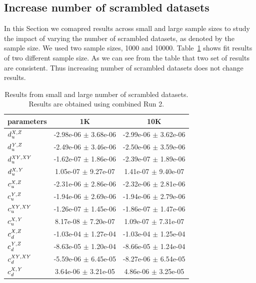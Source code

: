 \subsection{Increase number of scrambled datasets}
\label{lab:10K_scrambleddatasets}


In this Section we comapred results across small and large sample sizes to study the  
impact of varying the number of scrambled datasets, 
as denoted by the sample size. We used two sample sizes, 1000 and 10000.
Table~\ref{table:scrambel_results_10K} shows fit results of two different sample size.
As we can see from the table that two set of results are consistent. Thus increasing number 
of scrambled datasets does not change results.

\begin{table}[hp]
    \begin{center}
    \begin{tabular}{|l|c|c|}
    \hline
    
    parameters & 1K & 10K \\ 
    \hline
    $d_{\it u}^{\it X,Z}$ & -2.98e-06 $\pm$ 3.68e-06& -2.99e-06 $\pm$ 3.62e-06\\
    \hline
    $d_{\it u}^{\it Y,Z}$ & -2.49e-06 $\pm$ 3.46e-06& -2.50e-06 $\pm$ 3.59e-06\\
    \hline
    $d_{\it u}^{\it XY,XY}$ & -1.62e-07 $\pm$ 1.86e-06& -2.39e-07 $\pm$ 1.89e-06\\
    \hline
    $d_{\it u}^{\it X,Y}$ & 1.05e-07 $\pm$ 9.27e-07& 1.41e-07 $\pm$ 9.40e-07\\
    \hline
    $c_{\it u}^{\it X,Z}$ & -2.31e-06 $\pm$ 2.86e-06& -2.32e-06 $\pm$ 2.81e-06\\
    \hline
    $c_{\it u}^{\it Y,Z}$ & -1.94e-06 $\pm$ 2.69e-06& -1.94e-06 $\pm$ 2.79e-06\\
    \hline
    $c_{\it u}^{\it XY,XY}$ & -1.26e-07 $\pm$ 1.45e-06& -1.86e-07 $\pm$ 1.47e-06\\
    \hline
    $c_{\it u}^{\it X,Y}$ & 8.17e-08 $\pm$ 7.20e-07& 1.09e-07 $\pm$ 7.31e-07\\
    \hline
    $c_{\it d}^{\it X,Z}$ & -1.03e-04 $\pm$ 1.27e-04& -1.03e-04 $\pm$ 1.25e-04\\
    \hline
    $c_{\it d}^{\it Y,Z}$ & -8.63e-05 $\pm$ 1.20e-04& -8.66e-05 $\pm$ 1.24e-04\\
    \hline
    $c_{\it d}^{\it XY,XY}$ & -5.59e-06 $\pm$ 6.45e-05& -8.27e-06 $\pm$ 6.54e-05\\
    \hline
    $c_{\it d}^{\it X,Y}$ & 3.64e-06 $\pm$ 3.21e-05& 4.86e-06 $\pm$ 3.25e-05\\
    \hline
    
    \hline
    \end{tabular}
    \end{center}
    \caption{Results from small and large number of scrambled datasets.
        Results are obtained using combined Run 2.
    }\label{table:scrambel_results_10K}
\end{table}







